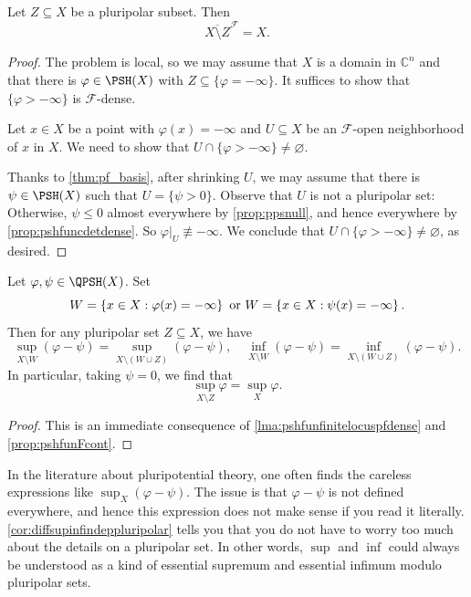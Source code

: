\begin{lemma}\label{lma:pshfunfinitelocuspfdense}
    Let $Z\subseteq X$ be a pluripolar subset. Then
    \[
    \overline{X\setminus Z}^{\mathcal{F}}=X.
    \]
\end{lemma}
\begin{proof}
    The problem is local, so we may assume that $X$ is a domain in $\mathbb{C}^n$ and that there is $\varphi\in \PSH(X)$ with $Z\subseteq\{\varphi=-\infty\}$. It suffices to show that $\{\varphi>-\infty\}$ is $\mathcal{F}$-dense.

    Let $x\in X$ be a point with $\varphi(x)=-\infty$ and $U\subseteq X$ be an $\mathcal{F}$-open neighborhood of $x$ in $X$. We need to show that $U\cap \{\varphi>-\infty\}\neq \varnothing$.

    Thanks to \cref{thm:pf_basis}, after shrinking $U$, we may assume that there is $\psi\in \PSH(X)$ such that $U=\{\psi>0\}$. Observe that $U$ is not a pluripolar set: Otherwise, $\psi\leq 0$ almost everywhere by \cref{prop:ppsnull}, and hence everywhere by \cref{prop:pshfuncdetdense}. So $\varphi|_U\not\equiv -\infty$. We conclude that $U\cap \{\varphi>-\infty\}\neq \varnothing$, as desired.
\end{proof}

\begin{corollary}\label{cor:diffsupinfindeppluripolar}
    Let $\varphi,\psi\in \QPSH(X)$. Set
    \[
    W=\left\{x\in X:\varphi(x)=-\infty\right\}\textup{ or }W=\left\{x\in X:\psi(x)=-\infty\right\}.
    \]
    Then for any pluripolar set $Z\subseteq X$, we have
    \[
    \sup_{X\setminus W}(\varphi-\psi) =\sup_{X\setminus (W\cup Z)}(\varphi-\psi),\quad \inf_{X\setminus W}(\varphi-\psi) =\inf_{X\setminus (W\cup Z)}(\varphi-\psi).
    \]
    In particular, taking $\psi=0$, we find that
    \[
    \sup_{X\setminus Z}\varphi=\sup_X \varphi.
    \]
\end{corollary}
\begin{proof}
    This is an immediate consequence of \cref{lma:pshfunfinitelocuspfdense} and \cref{prop:pshfunFcont}.
\end{proof}

In the literature about pluripotential theory, one often finds the careless expressions like $\sup_X (\varphi-\psi)$. The issue is that $\varphi-\psi$ is not defined everywhere, and hence this expression does not make sense if you read it literally. \cref{cor:diffsupinfindeppluripolar} tells you that you do not have to worry too much about the details on a pluripolar set. In other words, $\sup$ and $\inf$ could always be understood as a kind of essential supremum and essential infimum modulo pluripolar sets.

